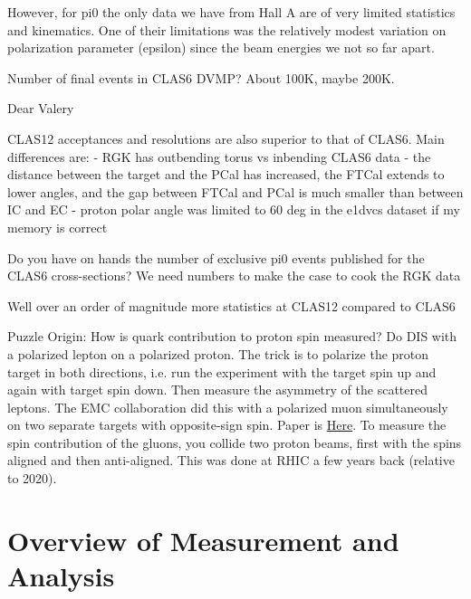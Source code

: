 However, for pi0 the only data we have from Hall A are of very limited statistics and kinematics. One of their limitations was the relatively modest variation on polarization parameter (epsilon) since the beam energies we not so far apart. 
 
 Number of final events in CLAS6 DVMP? About 100K, maybe 200K. 
 
 
 
 Dear Valery

CLAS12 acceptances and resolutions are also superior to that of CLAS6. Main differences are:
- RGK has outbending torus vs inbending CLAS6 data
- the distance between the target and the PCal has increased, the FTCal extends to lower angles, and the gap between FTCal and PCal is much smaller than between IC and EC
- proton polar angle was limited to 60 deg in the e1dvcs dataset if my memory is correct

Do you have on hands the number of exclusive pi0 events published for the CLAS6 cross-sections?
We need numbers to make the case to cook the RGK data

Well over an order of magnitude more statistics at CLAS12 compared to CLAS6


    Puzzle Origin: How is quark contribution to proton spin measured?
        Do DIS with a polarized lepton on a polarized proton. The trick is to polarize the proton target in both directions, i.e. run the experiment with the target spin up and again with target spin down. Then measure the asymmetry of the scattered leptons. The EMC collaboration did this with a polarized muon simultaneously on two separate targets with opposite-sign spin. Paper is \href{https://www-sciencedirect-com.libproxy.mit.edu/science/article/pii/0550321389900898?via\%3Dihub}{Here}. To measure the spin contribution of the gluons, you collide two proton beams, first with the spins aligned and then anti-aligned. This was done at RHIC a few years back (relative to 2020). 

\section{Overview of Measurement and Analysis}\label{sec:anaflow}


